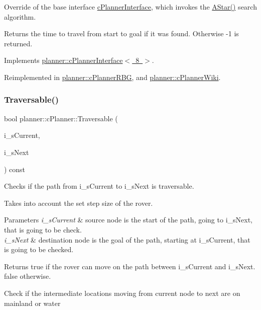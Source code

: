 Override of the base interface \mbox{\hyperlink{classplanner_1_1c_planner_interface}{c\+Planner\+Interface}}, which invokes the \mbox{\hyperlink{classplanner_1_1c_planner_a341e70531266f023ac9461d18979d1ef}{A\+Star()}} search algorithm. 

\begin{DoxyReturn}{Returns}
the time to travel from start to goal if it was found. Otherwise -\/1 is returned. 
\end{DoxyReturn}


Implements \mbox{\hyperlink{classplanner_1_1c_planner_interface_a7a06632a8c53906daf39611d9692ffa5}{planner\+::c\+Planner\+Interface$<$ 8 $>$}}.



Reimplemented in \mbox{\hyperlink{classplanner_1_1c_planner_r_b_g_a0bbd752702da582a47dbd153c0065eb5}{planner\+::c\+Planner\+R\+BG}}, and \mbox{\hyperlink{classplanner_1_1c_planner_wiki_a9d18be721400b51162ff463ab11d1721}{planner\+::c\+Planner\+Wiki}}.

\mbox{\label{classplanner_1_1c_planner_ab17c52bf6dd433b8f392a5bf2bc4b9a1}} 
\subsubsection{\texorpdfstring{Traversable()}{Traversable()}}
{\footnotesize\ttfamily bool planner\+::c\+Planner\+::\+Traversable (\begin{DoxyParamCaption}\item[{std\+::shared\+\_\+ptr$<$ \mbox{\hyperlink{structplanner_1_1t_node}{t\+Node}} $>$}]{i\+\_\+s\+Current,  }\item[{std\+::shared\+\_\+ptr$<$ \mbox{\hyperlink{structplanner_1_1t_node}{t\+Node}} $>$}]{i\+\_\+s\+Next }\end{DoxyParamCaption}) const}



Checks if the path from i\+\_\+s\+Current to i\+\_\+s\+Next is traversable. 

Takes into account the set step size of the rover.


\begin{DoxyParams}{Parameters}
{\em i\+\_\+s\+Current} & source node is the start of the path, going to i\+\_\+s\+Next, that is going to be check. \\
\hline
{\em i\+\_\+s\+Next} & destination node is the goal of the path, starting at i\+\_\+s\+Current, that is going to be checked. \\
\hline
\end{DoxyParams}
\begin{DoxyReturn}{Returns}
true if the rover can move on the path between i\+\_\+s\+Current and i\+\_\+s\+Next. false otherwise. 
\end{DoxyReturn}
Check if the intermediate locations moving from current node to next are on mainland or water

